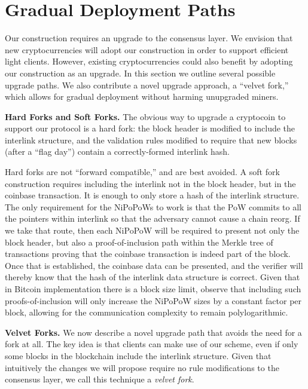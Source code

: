 \section{Gradual Deployment Paths}

\label{sec.forks}
Our construction requires an upgrade to the consensus layer. We envision that
new cryptocurrencies will adopt our construction in order to support efficient
light clients. However, existing cryptocurrencies could also benefit by adopting
our construction as an upgrade. In this section we outline several possible
upgrade paths. We also contribute a novel upgrade approach, a ``velvet fork,''
which allows for gradual deployment without harming unupgraded miners.

\noindent
{\bf Hard Forks and Soft Forks.}
The obvious way to upgrade a cryptocoin to support our protocol is a hard fork:
the block header is modified to include the interlink structure, and the
validation rules modified to require that new blocks (after a ``flag day'')
contain a correctly-formed interlink hash.

Hard forks are not ``forward compatible,'' and are best avoided. A soft fork
construction requires including the interlink not in the block
header, but in the coinbase transaction. It is enough to only store a hash of
the interlink structure. The only requirement for the NiPoPoWs to work is that the
PoW commits to all the pointers within interlink so that the adversary cannot
cause a chain reorg. If we take that route, then each NiPoPoW will be required to
present not only the block header, but also a proof-of-inclusion path within the
Merkle tree of transactions proving that the coinbase transaction is indeed part
of the block. Once that is established, the coinbase data can be presented, and
the verifier will thereby know that the hash of the interlink data structure is
correct. Given that in Bitcoin implementation there is a block size limit,
observe that including such proofs-of-inclusion will only increase the NiPoPoW
sizes by a constant factor per block, allowing for the communication complexity
to remain polylogarithmic.

\noindent
{\bf Velvet Forks.}
We now describe a novel upgrade path that avoids the need for a fork at all. The
key idea is that clients can make use of our scheme, even if only some blocks in
the blockchain include the interlink structure. Given that intuitively the
changes we will propose require no rule modifications to the consensus layer, we call this
technique a \textit{velvet fork}.

